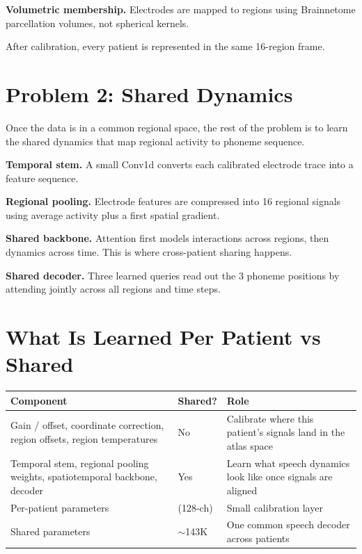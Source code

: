 \documentclass[12pt,letterpaper]{article}
\begin{document}
\textbf{Volumetric membership.} Electrodes are mapped to regions using Brainnetome parcellation volumes, not spherical kernels.

After calibration, every patient is represented in the same 16-region frame.


\section{Problem 2: Shared Dynamics}

Once the data is in a common regional space, the rest of the problem is to learn the shared dynamics that map regional activity to phoneme sequence.

\textbf{Temporal stem.} A small Conv1d converts each calibrated electrode trace into a feature sequence.

\textbf{Regional pooling.} Electrode features are compressed into 16 regional signals using average activity plus a first spatial gradient.

\textbf{Shared backbone.} Attention first models interactions across regions, then dynamics across time. This is where cross-patient sharing happens.

\textbf{Shared decoder.} Three learned queries read out the 3 phoneme positions by attending jointly across all regions and time steps.


\section{What Is Learned Per Patient vs Shared}

\begin{table}[ht]\centering\small
\begin{tabular}{@{}>{\raggedright\arraybackslash}p{5.4cm}>{\raggedright\arraybackslash}p{2.3cm}>{\raggedright\arraybackslash}p{5.0cm}@{}}
\toprule
\textbf{Component} & \textbf{Shared?} & \textbf{Role} \\
\midrule
Gain / offset, coordinate correction, region offsets, region temperatures & No & Calibrate where this patient's signals land in the atlas space \\
Temporal stem, regional pooling weights, spatiotemporal backbone, decoder & Yes & Learn what speech dynamics look like once signals are aligned \\
\midrule
Per-patient parameters & 326 (128-ch) & Small calibration layer \\
Shared parameters & ${\sim}$143K & One common speech decoder across patients \\
\bottomrule
\end{tabular}
\end{table}
\end{document}
